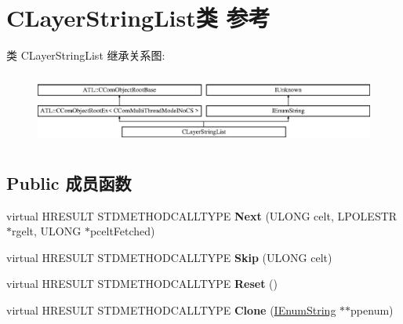 \hypertarget{class_c_layer_string_list}{}\section{C\+Layer\+String\+List类 参考}
\label{class_c_layer_string_list}
类 C\+Layer\+String\+List 继承关系图\+:\begin{figure}[H]
\begin{center}
\leavevmode
\includegraphics[height=2.386364cm]{class_c_layer_string_list}
\end{center}
\end{figure}
\subsection*{Public 成员函数}
\begin{DoxyCompactItemize}
\item 
\mbox{\label{class_c_layer_string_list_a261a49d7f9a09ffcb7b5716945b11a23}} 
virtual H\+R\+E\+S\+U\+LT S\+T\+D\+M\+E\+T\+H\+O\+D\+C\+A\+L\+L\+T\+Y\+PE {\bfseries Next} (U\+L\+O\+NG celt, L\+P\+O\+L\+E\+S\+TR $\ast$rgelt, U\+L\+O\+NG $\ast$pcelt\+Fetched)
\item 
\mbox{\label{class_c_layer_string_list_afcdc53555aa797580b7a6270b6f964d0}} 
virtual H\+R\+E\+S\+U\+LT S\+T\+D\+M\+E\+T\+H\+O\+D\+C\+A\+L\+L\+T\+Y\+PE {\bfseries Skip} (U\+L\+O\+NG celt)
\item 
\mbox{\label{class_c_layer_string_list_a7ec1d6d83ebf8cabc8fbc9d7a0ccb67a}} 
virtual H\+R\+E\+S\+U\+LT S\+T\+D\+M\+E\+T\+H\+O\+D\+C\+A\+L\+L\+T\+Y\+PE {\bfseries Reset} ()
\item 
\mbox{\label{class_c_layer_string_list_acf540e25601ef777dfa016ef98dadacd}} 
virtual H\+R\+E\+S\+U\+LT S\+T\+D\+M\+E\+T\+H\+O\+D\+C\+A\+L\+L\+T\+Y\+PE {\bfseries Clone} (\hyperlink{interface_i_enum_string}{I\+Enum\+String} $\ast$$\ast$ppenum)
\end{DoxyCompactItemize}
